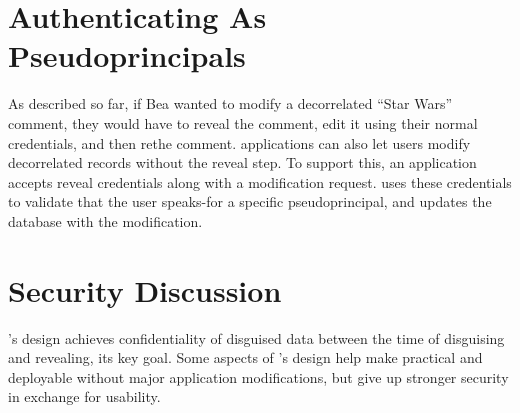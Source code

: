 



\section{Authenticating As Pseudoprincipals}

As described so far, if Bea wanted to modify a decorrelated ``Star Wars''
comment, they would have to reveal the comment, edit it using their normal
credentials, and then re\xx the comment.
%
\sys applications can also let users modify decorrelated records without
the reveal step.
%
To support this, an application accepts reveal credentials along with a
modification request. \sys uses these credentials to validate that the
user speaks-for a specific pseudoprincipal, and updates the
database with the modification.
%
%


\section{Security Discussion}
\label{s:eval-security}

%
%
\sys's design achieves confidentiality of disguised data between the time of
disguising and revealing, its key goal.
%
Some aspects of \sys's design help make \sys practical and deployable without
major application modifications, but give up stronger security in exchange for
usability.
%

